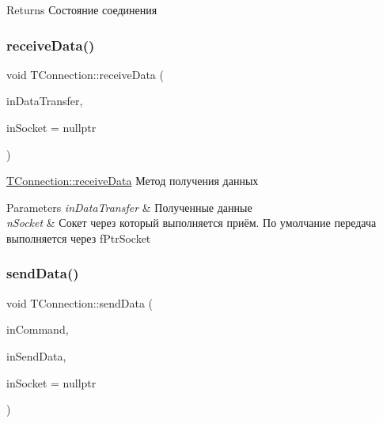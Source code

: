 \begin{DoxyReturn}{Returns}
Состояние соединения 
\end{DoxyReturn}
\mbox{\label{classconnection_1_1_t_connection_aa55500363892831d9764496cd63cec73}} 
\subsubsection{\texorpdfstring{receive\+Data()}{receiveData()}}
{\footnotesize\ttfamily void T\+Connection\+::receive\+Data (\begin{DoxyParamCaption}\item[{\hyperlink{structconnection_1_1_t_data_transfer}{T\+Data\+Transfer} \&}]{in\+Data\+Transfer,  }\item[{const std\+::shared\+\_\+ptr$<$ Q\+Tcp\+Socket $>$}]{in\+Socket = {\ttfamily nullptr} }\end{DoxyParamCaption})}



\hyperlink{classconnection_1_1_t_connection_aa55500363892831d9764496cd63cec73}{T\+Connection\+::receive\+Data} Метод получения данных 


\begin{DoxyParams}{Parameters}
{\em in\+Data\+Transfer} & Полученные данные \\
\hline
{\em n\+Socket} & Сокет через который выполняется приём. По умолчание передача выполняется через f\+Ptr\+Socket \\
\hline
\end{DoxyParams}
\mbox{\label{classconnection_1_1_t_connection_acf6af6c583b67379f8aa1efb4ab9e79e}} 
\subsubsection{\texorpdfstring{send\+Data()}{sendData()}}
{\footnotesize\ttfamily void T\+Connection\+::send\+Data (\begin{DoxyParamCaption}\item[{const \hyperlink{classconnection_1_1_t_connection_a3550181cb2fa72eccfa55d23f45cea34}{T\+Connection\+::exchange\+Protocol}}]{in\+Command,  }\item[{const quint64}]{in\+Send\+Data,  }\item[{std\+::shared\+\_\+ptr$<$ Q\+Tcp\+Socket $>$}]{in\+Socket = {\ttfamily nullptr} }\end{DoxyParamCaption})}



